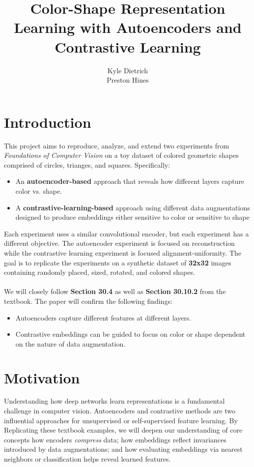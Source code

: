 \documentclass{article}
\title{Color-Shape Representation Learning with Autoencoders and Contrastive Learning}
\author{%
    Kyle Dietrich \\
    \And
    Preston Hines \\
}
\begin{document}
\maketitle
\begin{abstract}
\end{abstract}
\section{Introduction}
This project aims to reproduce, analyze, and extend two experiments from \textit{Foundations of Computer Vision} on a toy dataset of colored geometric shapes comprised of circles, trianges, and squares.
Specifically:
\begin{itemize}
    \item An \textbf{autoencoder-based} approach that reveals how different layers capture color vs. shape.
    \item A \textbf{contrastive-learning-based} approach using different data augmentations designed to produce embeddings either sensitive to color or sensitive to shape
\end{itemize}
Each experiment uses a similar convolutional encoder, but each experiment has a different objective.
The autoencoder experiment is focused on reconstruction while the contrastive learning experiment is focused alignment-uniformity.
The goal is to replicate the experiments on a synthetic dataset of \textbf{32x32} images containing randomly placed, sized, rotated, and colored shapes.
\\\\
We will closely follow \textbf{Section 30.4} as well as \textbf{Section 30.10.2} from the textbook.
The paper will confirm the following findings:
\begin{itemize}
    \item Autoencoders capture different features at different layers.
    \item Contrastive embeddings can be guided to focus on color or shape dependent on the nature of data augmentation.
\end{itemize}
\section{Motivation}
Understanding how deep networks learn representations is a fundamental challenge in computer vision.
Autoencoders and contrastive methods are two influential approaches for unsupervised or self-supervised feature learning.
By Replicating these textbook examples, we will deepen our understanding of core concepts\textemdash
how encoders \textit{compress} data;
how embeddings reflect invariances introduced by data augmentations;
and how evaluating embeddings via nearest neighbors or classification helps reveal learned features.
\newpage
\end{document}
